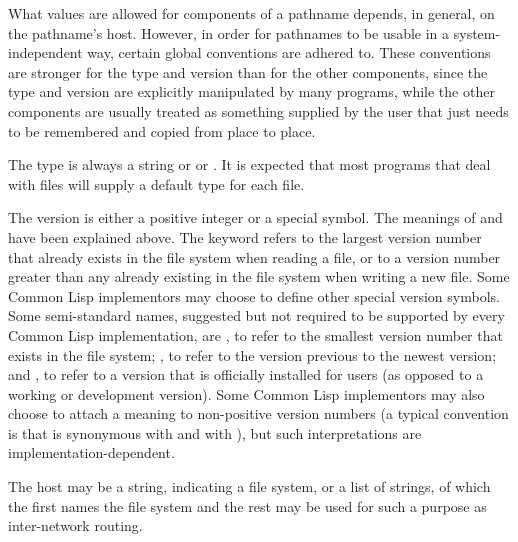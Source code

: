 What values are allowed for components of a pathname depends, in general,
on the pathname's host.  However, in order for pathnames to be usable
in a system-independent way, certain global conventions are adhered to.
These conventions are stronger for the type and version than for the
other components, since the type and version are explicitly manipulated by
many programs, while the other components are usually treated as something
supplied by the user that just needs to be remembered and copied
from place to place.

The type is always a string or {\nil} or .
It is expected that most
programs that deal with files will supply a default type for each file.

The version is either a positive integer or a special symbol.  The
meanings of {\nil} and  have been explained
above.  The keyword  refers to the largest version number
that already exists in the file system when reading a file, or to
a version number
greater than any already existing in the file system
when writing a new file.  Some Common Lisp implementors
may choose to define other special version symbols.
Some semi-standard names, suggested but not required to be supported
by every Common Lisp implementation, are
, to refer to the smallest version number that exists
in the file system;
, to refer to the version previous to the newest version;
and , to refer to a version that is officially installed
for users (as opposed to a working or development version).
Some Common Lisp implementors may also choose to attach a meaning to
non-positive version numbers (a typical convention is that 
is synonymous with  and  with ),
but such interpretations are implementation-dependent.

The host may be a string, indicating a file system, or a list
of strings, of which the first names the file system and the rest
may be used for such a purpose as inter-network routing.

